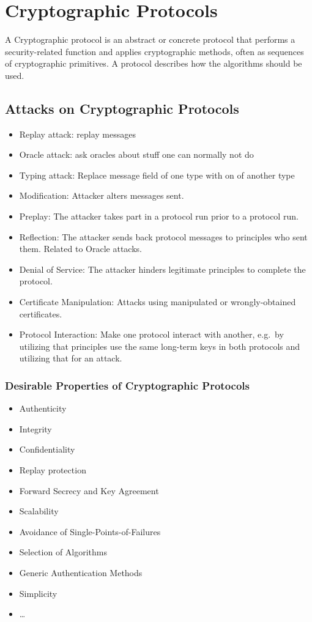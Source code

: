 
\section{Cryptographic Protocols}
A Cryptographic protocol is an abstract or concrete protocol that performs a security-related function and applies cryptographic methods, often as sequences of cryptographic primitives.
A protocol describes how the algorithms should be used. 

\subsection{Attacks on Cryptographic Protocols}
\begin{itemize}[noitemsep, topsep=0pt]
  \item Replay attack: replay messages
  \item Oracle attack: ask oracles about stuff one can normally not do
  \item Typing attack: Replace message field of one type with on of another type
  \item Modification: Attacker alters messages sent.
  \item Preplay: The attacker takes part in a protocol run prior to a protocol run.
  \item Reflection: The attacker sends back protocol messages to principles who sent them. Related to Oracle attacks.
  \item Denial of Service: The attacker hinders legitimate principles to complete the protocol.
  \item Certificate Manipulation: Attacks using manipulated or wrongly-obtained certificates.
  \item Protocol Interaction: Make one protocol interact with another, e.g.\ by utilizing that principles use the same long-term keys in both protocols and utilizing that for an attack.
\end{itemize}

\subsubsection{Desirable Properties of Cryptographic Protocols}
\begin{itemize}[noitemsep, topsep=0pt]
  \item Authenticity
  \item Integrity
  \item Confidentiality
  \item Replay protection
  \item Forward Secrecy and Key Agreement
  \item Scalability
  \item Avoidance of Single-Points-of-Failures
  \item Selection of Algorithms
  \item Generic Authentication Methods
  \item Simplicity
  \item \dots
\end{itemize}



